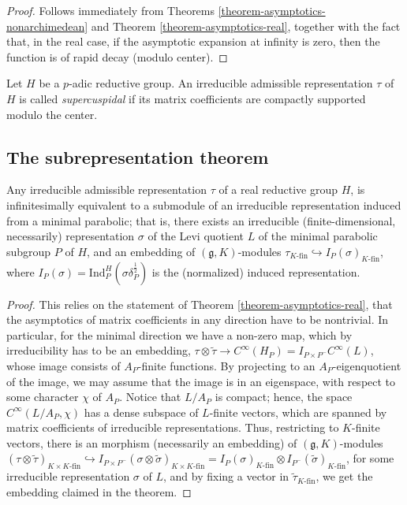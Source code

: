 \begin{proof}
 Follows immediately from Theorems \ref{theorem-asymptotics-nonarchimedean} and Theorem \ref{theorem-asymptotics-real}, together with the fact that, in the real case, if the asymptotic expansion at infinity is zero, then the function is of rapid decay (modulo center).
\end{proof}



\begin{definition}
 \label{definition-supercuspidal}
Let $H$ be a $p$-adic reductive group. An irreducible admissible representation $\tau$ of $H$ is called {\it supercuspidal} if its matrix coefficients are compactly supported modulo the center.
\end{definition}

\subsection{The subrepresentation theorem}
\label{subsection-subrepresentation}

\begin{theorem}
 \label{theorem-subrepresentation}
Any irreducible admissible representation $\tau$ of a real reductive group $H$, is infinitesimally equivalent to a submodule of an irreducible representation induced from a minimal parabolic; that is, there exists an irreducible (finite-dimensional, necessarily) representation $\sigma$ of the Levi quotient $L$ of the minimal parabolic subgroup $P$ of $H$, and an embedding of $(\mathfrak g, K)$-modules $\tau_{K\text{-fin}} \hookrightarrow I_P(\sigma)_{K\text{-fin}}$, where $I_P(\sigma) = \text{Ind}_P^H(\sigma \delta_P^\frac{1}{2})$ is the (normalized) induced representation.
\end{theorem}

\begin{proof}
 This relies on the statement of Theorem \ref{theorem-asymptotics-real}, that the asymptotics of matrix coefficients in any direction have to be nontrivial. In particular, for the minimal direction we have a non-zero map, which by irreducibility has to be an embedding, $\tau\otimes\tilde \tau \to C^\infty(H_P) = I_{P\times P^-} C^\infty(L)$, whose image consists of $A_P$-finite functions. By projecting to an $A_P$-eigenquotient of the image, we may assume that the image is in an eigenspace, with respect to some character $\chi$ of $A_P$. Notice that $L/A_P$ is compact; hence, the space $C^\infty(L/A_P, \chi)$ has a dense subspace of $L$-finite vectors, which are spanned by matrix coefficients of irreducible representations. Thus, restricting to $K$-finite vectors, there is an morphism (necessarily an embedding) of $(\mathfrak g, K)$-modules $(\tau\otimes\tilde\tau)_{K\times K\text{-fin}} \hookrightarrow I_{P\times P^-} (\sigma\otimes\tilde\sigma)_{K\times K\text{-fin}} = I_P(\sigma)_{K\text{-fin}} \otimes I_{P^-}(\tilde\sigma)_{K\text{-fin}}$, for some irreducible representation $\sigma$ of $L$, and by fixing a vector in $\tilde\tau_{K\text{-fin}}$, we get the embedding claimed in the theorem.
\end{proof}



